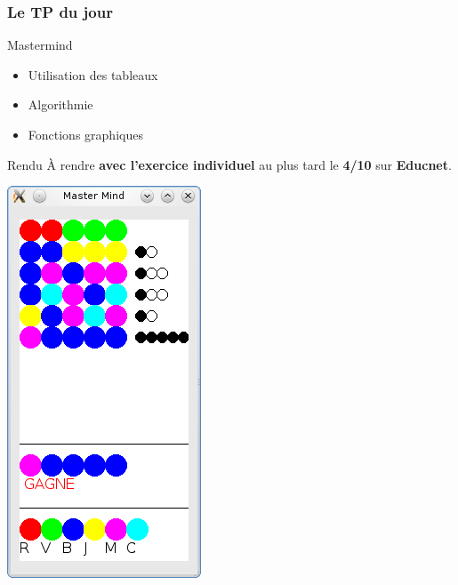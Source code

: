 \begin{frame}
\frametitle{Le TP du jour}

\begin{minipage}{0.48\linewidth}
	\begin{block}{Mastermind}
		\begin{itemize}
			\item Utilisation des tableaux
			\item Algorithmie
			\item Fonctions graphiques
		\end{itemize}
	\end{block}
    
    \begin{alertblock}{Rendu}
    À rendre \textbf{avec l'exercice individuel} au plus tard le \textbf{4/10} sur \textbf{Educnet}.
    \end{alertblock}
\end{minipage}
\hfill
\begin{minipage}{0.48\linewidth}
	\centering
	\includegraphics[width=0.6\linewidth]{images/mastermind.png}
\end{minipage}

\end{frame}



